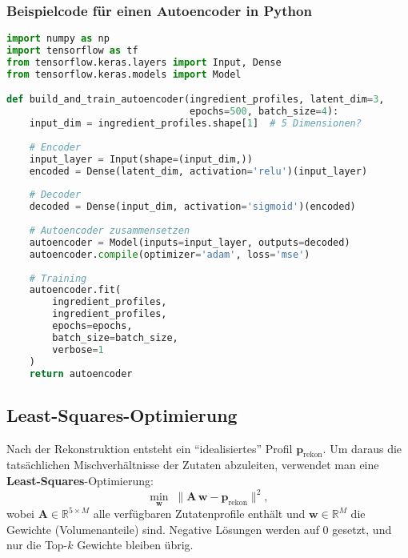 \documentclass[12pt,a4paper]{report}
\begin{document}
\subsubsection*{Beispielcode für einen Autoencoder in Python}
\begin{lstlisting}[language=Python, caption={Einfacher Autoencoder-Aufbau mit Keras}]
import numpy as np
import tensorflow as tf
from tensorflow.keras.layers import Input, Dense
from tensorflow.keras.models import Model

def build_and_train_autoencoder(ingredient_profiles, latent_dim=3, 
                                epochs=500, batch_size=4):
    input_dim = ingredient_profiles.shape[1]  # 5 Dimensionen?
    
    # Encoder
    input_layer = Input(shape=(input_dim,))
    encoded = Dense(latent_dim, activation='relu')(input_layer)
    
    # Decoder
    decoded = Dense(input_dim, activation='sigmoid')(encoded)
    
    # Autoencoder zusammensetzen
    autoencoder = Model(inputs=input_layer, outputs=decoded)
    autoencoder.compile(optimizer='adam', loss='mse')
    
    # Training
    autoencoder.fit(
        ingredient_profiles,
        ingredient_profiles,
        epochs=epochs,
        batch_size=batch_size,
        verbose=1
    )
    return autoencoder
\end{lstlisting}

\subsection{Least-Squares-Optimierung}
Nach der Rekonstruktion entsteht ein \enquote{idealisiertes} Profil \(\mathbf{p}_{\text{rekon}}\). Um daraus die tatsächlichen Mischverhältnisse der Zutaten abzuleiten, verwendet man eine \textbf{Least-Squares}-Optimierung:
\[
\min_{\mathbf{w}} \;\|\mathbf{A}\,\mathbf{w} - \mathbf{p}_{\text{rekon}}\|^2,
\]
wobei \(\mathbf{A} \in \mathbb{R}^{5 \times M}\) alle verfügbaren Zutatenprofile enthält und \(\mathbf{w}\in \mathbb{R}^M\) die Gewichte (Volumenanteile) sind. Negative Lösungen werden auf 0 gesetzt, und nur die Top-\(k\) Gewichte bleiben übrig.
\end{document}
